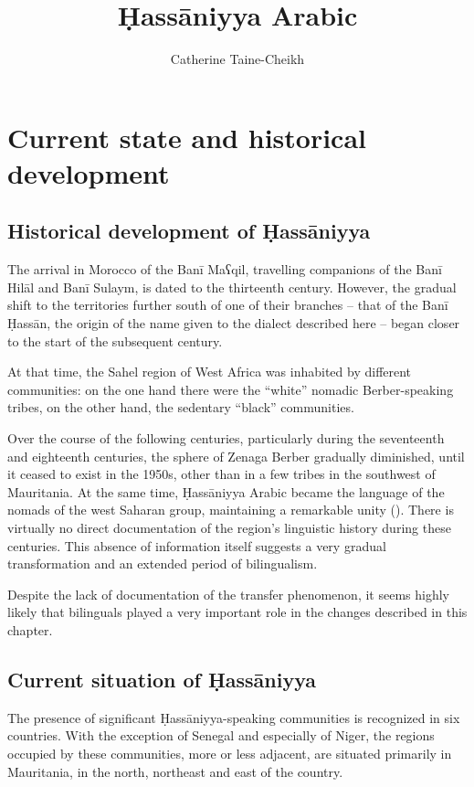 \documentclass[output=paper]{langsci/langscibook}
\author{Catherine Taine-Cheikh\affiliation{CNRS, LACITO}}
\title{Ḥassāniyya Arabic}
\begin{document}
\maketitle 
 

\section{Current state and historical development}

\subsection{Historical development of Ḥassāniyya} %

The arrival in Morocco of the Banī Maʕqil, travelling companions of the Banī Hilāl and Banī Sulaym, is dated to the thirteenth century. However, the gradual shift to the territories further south of one of their branches – that of the Banī Ḥassān, the origin of the name given to the dialect described here – began closer to the start of the subsequent century. 

At that time, the Sahel region of West Africa was inhabited by different communities: on the one hand there were the “white” nomadic Berber-speaking tribes, on the other hand, the sedentary “black” communities.

Over the course of the following centuries, particularly during the seventeenth and eighteenth centuries, the sphere of Zenaga Berber gradually diminished, until it ceased to exist in the 1950s, other than in a few tribes in the southwest of Mauritania. At the same time, Ḥassāniyya Arabic became the language of the nomads of the west Saharan group, maintaining a remarkable unity (\citealt{Taine-Cheikh2016,Taine-Cheikh2018historical}). There is virtually no direct documentation of the region’s linguistic history during these centuries. This absence of information itself suggests a very gradual transformation and an extended period of bilingualism.

Despite the lack of documentation of the transfer phenomenon, it seems highly likely that bilinguals played a very important role in the changes described in this chapter. 

\subsection{Current situation of Ḥassāniyya} %

The presence of significant Ḥassāniyya-speaking communities is recognized in six countries. With the exception of Senegal and especially of Niger, the regions occupied by these communities, more or less adjacent, are situated primarily in Mauritania, in the north, northeast and east of the country. 
\end{document}
